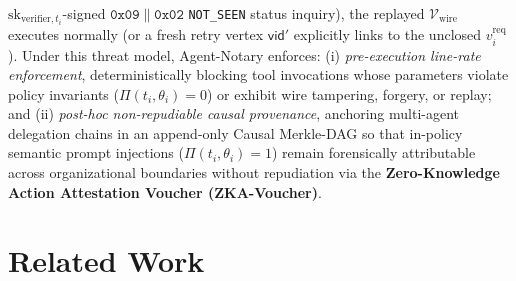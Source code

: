\documentclass[conference,10pt]{IEEEtran}
\begin{document}
$\text{sk}_{\text{verifier}, t_i}$-signed $\mathtt{0x09} \parallel \mathtt{0x02}$ \texttt{NOT\_SEEN} status inquiry), the replayed $\mathcal{V}_{\text{wire}}$ executes normally (or a fresh retry vertex $\textsf{vid}'$ explicitly links to the unclosed $v_i^{\text{req}}$). Under this threat model, Agent-Notary enforces: (i) \emph{pre-execution line-rate enforcement}, deterministically blocking tool invocations whose parameters violate policy invariants ($\Pi(t_i, \theta_i) = 0$) or exhibit wire tampering, forgery, or replay; and (ii) \emph{post-hoc non-repudiable causal provenance}, anchoring multi-agent delegation chains in an append-only Causal Merkle-DAG so that in-policy semantic prompt injections ($\Pi(t_i, \theta_i) = 1$) remain forensically attributable across organizational boundaries without repudiation via the \textbf{Zero-Knowledge Action Attestation Voucher (ZKA-Voucher)}.

\section{Related Work}
\end{document}

